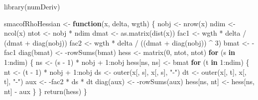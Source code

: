 \documentclass[
  12pt,
  letterpaper,
  DIV=11,
  numbers=noendperiod]{scrartcl}
\newenvironment{Shaded}{\begin{snugshade}}{\end{snugshade}}
\newcommand{\ControlFlowTok}[1]{\textcolor[rgb]{0.00,0.23,0.31}{\textbf{#1}}}
\newcommand{\DecValTok}[1]{\textcolor[rgb]{0.68,0.00,0.00}{#1}}
\newcommand{\FunctionTok}[1]{\textcolor[rgb]{0.28,0.35,0.67}{#1}}
\newcommand{\NormalTok}[1]{\textcolor[rgb]{0.00,0.23,0.31}{#1}}
\newcommand{\OtherTok}[1]{\textcolor[rgb]{0.00,0.23,0.31}{#1}}
\newcommand{\SpecialCharTok}[1]{\textcolor[rgb]{0.37,0.37,0.37}{#1}}
\newcommand{\StringTok}[1]{\textcolor[rgb]{0.13,0.47,0.30}{#1}}
\begin{document}
\begin{Shaded}
\begin{Highlighting}[]
\FunctionTok{library}\NormalTok{(numDeriv)}

\NormalTok{smacofRhoHessian }\OtherTok{\textless{}{-}} \ControlFlowTok{function}\NormalTok{(x, delta, wgth) \{}
\NormalTok{  nobj }\OtherTok{\textless{}{-}} \FunctionTok{nrow}\NormalTok{(x)}
\NormalTok{  ndim }\OtherTok{\textless{}{-}} \FunctionTok{ncol}\NormalTok{(x)}
\NormalTok{  ntot }\OtherTok{\textless{}{-}}\NormalTok{ nobj }\SpecialCharTok{*}\NormalTok{ ndim}
\NormalTok{  dmat }\OtherTok{\textless{}{-}} \FunctionTok{as.matrix}\NormalTok{(}\FunctionTok{dist}\NormalTok{(x))}
\NormalTok{  fac1 }\OtherTok{\textless{}{-}}\NormalTok{ wgth }\SpecialCharTok{*}\NormalTok{ delta }\SpecialCharTok{/}\NormalTok{ (dmat }\SpecialCharTok{+} \FunctionTok{diag}\NormalTok{(nobj))}
\NormalTok{  fac2 }\OtherTok{\textless{}{-}}\NormalTok{ wgth }\SpecialCharTok{*}\NormalTok{ delta }\SpecialCharTok{/}\NormalTok{ ((dmat }\SpecialCharTok{+} \FunctionTok{diag}\NormalTok{(nobj)) }\SpecialCharTok{\^{}} \DecValTok{3}\NormalTok{)}
\NormalTok{  bmat }\OtherTok{\textless{}{-}} \SpecialCharTok{{-}}\NormalTok{fac1}
  \FunctionTok{diag}\NormalTok{(bmat) }\OtherTok{\textless{}{-}} \SpecialCharTok{{-}}\FunctionTok{rowSums}\NormalTok{(bmat)}
\NormalTok{  hess }\OtherTok{\textless{}{-}} \FunctionTok{matrix}\NormalTok{(}\DecValTok{0}\NormalTok{, ntot, ntot)}
  \ControlFlowTok{for}\NormalTok{ (s }\ControlFlowTok{in} \DecValTok{1}\SpecialCharTok{:}\NormalTok{ndim) \{}
\NormalTok{    ns }\OtherTok{\textless{}{-}}\NormalTok{ (s }\SpecialCharTok{{-}} \DecValTok{1}\NormalTok{) }\SpecialCharTok{*}\NormalTok{ nobj }\SpecialCharTok{+} \DecValTok{1}\SpecialCharTok{:}\NormalTok{nobj}
\NormalTok{    hess[ns, ns] }\OtherTok{\textless{}{-}}\NormalTok{ bmat}
    \ControlFlowTok{for}\NormalTok{ (t }\ControlFlowTok{in} \DecValTok{1}\SpecialCharTok{:}\NormalTok{ndim) \{}
\NormalTok{      nt }\OtherTok{\textless{}{-}}\NormalTok{ (t }\SpecialCharTok{{-}} \DecValTok{1}\NormalTok{) }\SpecialCharTok{*}\NormalTok{ nobj }\SpecialCharTok{+} \DecValTok{1}\SpecialCharTok{:}\NormalTok{nobj}
\NormalTok{      ds }\OtherTok{\textless{}{-}} \FunctionTok{outer}\NormalTok{(x[, s], x[, s], }\StringTok{"{-}"}\NormalTok{)}
\NormalTok{      dt }\OtherTok{\textless{}{-}} \FunctionTok{outer}\NormalTok{(x[, t], x[, t], }\StringTok{"{-}"}\NormalTok{)}
\NormalTok{      aux }\OtherTok{\textless{}{-}} \SpecialCharTok{{-}}\NormalTok{fac2 }\SpecialCharTok{*}\NormalTok{ ds }\SpecialCharTok{*}\NormalTok{ dt}
      \FunctionTok{diag}\NormalTok{(aux) }\OtherTok{\textless{}{-}} \SpecialCharTok{{-}}\FunctionTok{rowSums}\NormalTok{(aux)}
\NormalTok{      hess[ns, nt] }\OtherTok{\textless{}{-}}\NormalTok{ hess[ns, nt] }\SpecialCharTok{{-}}\NormalTok{ aux}
\NormalTok{    \}}
\NormalTok{  \}}
  \FunctionTok{return}\NormalTok{(hess)}
\NormalTok{\}}


\end{Highlighting}
\end{Shaded}
\end{document}
